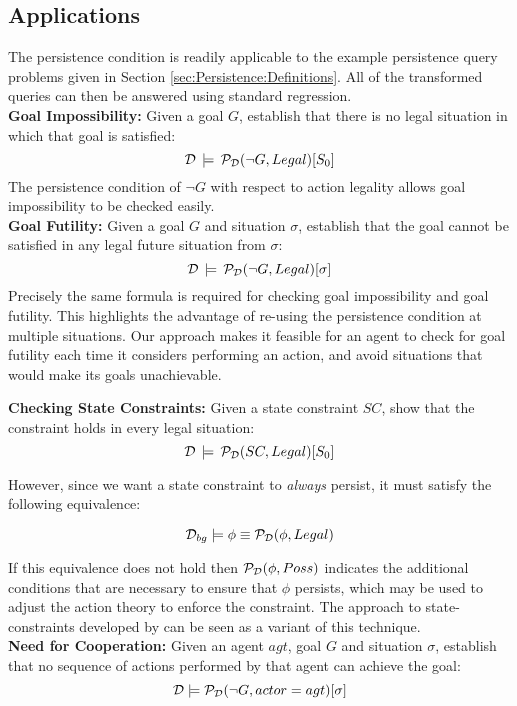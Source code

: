 \subsection{Applications}

The persistence condition is readily applicable to the example persistence
query problems given in Section \ref{sec:Persistence:Definitions}.
All of the transformed queries can then be answered using standard
regression.\\


\textbf{Goal Impossibility:} Given a goal $G$, establish that there
is no legal situation in which that goal is satisfied:\[
\mathcal{D}\,\models\,\mathcal{P}_{\mathcal{D}}(\neg G,Legal)[S_{0}]\]
 The persistence condition of $\neg G$ with respect to action legality
allows goal impossibility to be checked easily.\\


\textbf{Goal Futility:} Given a goal $G$ and situation $\sigma$,
establish that the goal cannot be satisfied in any legal future situation
from $\sigma$:\[
\mathcal{D}\,\models\,\mathcal{P}_{\mathcal{D}}(\neg G,Legal)[\sigma]\]
 Precisely the same formula is required for checking goal impossibility
and goal futility. This highlights the advantage of re-using the persistence
condition at multiple situations. Our approach makes it feasible for
an agent to check for goal futility each time it considers performing
an action, and avoid situations that would make its goals unachievable.

\newpage{}

\textbf{Checking State Constraints:} Given a state constraint $SC$,
show that the constraint holds in every legal situation:\[
\mathcal{D}\,\models\,\mathcal{P}_{\mathcal{D}}(SC,Legal)[S_{0}]\]


However, since we want a state constraint to \emph{always} persist,
it must satisfy the following equivalence:

\[
\mathcal{D}_{bg}\models\phi\equiv\mathcal{P}_{\mathcal{D}}(\phi,Legal)\]


If this equivalence does not hold then $\mathcal{P}_{\mathcal{D}}(\phi,Poss)$ indicates
the additional conditions that are necessary to ensure that $\phi$
persists, which may be used to adjust the action theory to enforce
the constraint. The approach to state-constraints developed by \citet{Lin94-StateConstraints}
can be seen as a variant of this technique.\\


\textbf{Need for Cooperation:} Given an agent $agt$, goal $G$ and
situation $\sigma$, establish that no sequence of actions performed
by that agent can achieve the goal:\[
\mathcal{D}\models\mathcal{P}_{\mathcal{D}}(\neg G,actor=agt)[\sigma]\]


